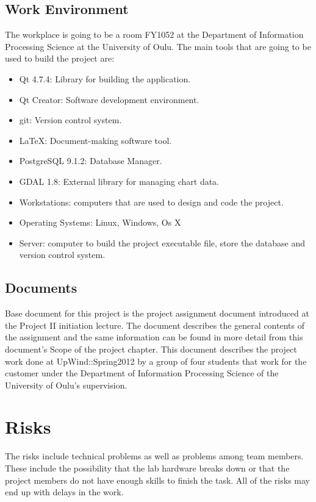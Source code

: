 \documentclass[12pt,titlepage,a4paper]{article}
\begin{document}
	\subsection{Work Environment}
		The workplace is going to be a room FY1052 at the Department of Information Processing Science at the University of 			Oulu. The main tools that are going to be used to build the project are:
		\begin{itemize}
			\item Qt 4.7.4: Library for building the application.
			\item Qt Creator:  Software development environment.
			\item git: Version control system.
			\item \LaTeX{}: Document-making software tool.
			\item PostgreSQL 9.1.2: Database Manager.
			\item GDAL 1.8: External library for managing chart data.
			\item Workstations: computers that are used to design and code the project. 
			\item Operating Systems: Linux, Windows, Os X
			\item Server: computer to build the project executable file, store the database and version control system.
		\end{itemize}

	\subsection{Documents}
	
		Base document for this project is the project assignment document introduced at the Project II initiation lecture.
		The document describes the general contents of the assignment and the same information can be found in more detail 			from this document's Scope of the project chapter.
		This document describes the project work done at UpWind::Spring2012 by a group of four students that work for the 			customer under the Department of Information Processing Science of the University of Oulu's supervision.

\section{Risks}

	The risks include technical problems as well as problems among team members. These include the possibility that the lab hardware breaks down or that the project members do not have enough skills to finish the task. All of the risks may end up with delays in the work. 
 
\end{document}
